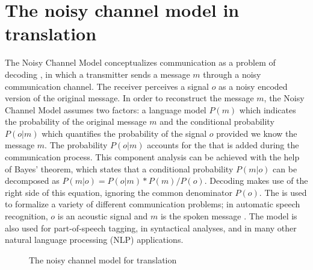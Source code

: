 \documentclass[output=paper]{LSP/langsci}
\begin{document}
\section{The noisy channel model in translation} 
\label{carl-schaeffer:sec:2}
The Noisy Channel Model conceptualizes communication as a problem of decoding \citep{Shannon1949}, in which a transmitter sends a message $m$ through a noisy communication channel. The receiver perceives a signal $o$ as a noisy encoded version of the original message. In order to reconstruct the message $m$, the Noisy Channel Model assumes two factors: a language model $P(m)$ which indicates the probability of the original message $m$ and the conditional probability $P(o|m)$ which quantifies the probability of the signal $o$ provided we know the message $m$. The probability $P(o|m)$ accounts for the  that is added during the communication process. This component analysis can be achieved with the help of Bayes' theorem, which states that a conditional probability $P(m|o)$ can be decomposed as $P(m|o) = P(o|m)*P(m)/P(o)$. Decoding makes use of the right side of this equation, ignoring the common denominator $P(o)$. The  is used to formalize a variety of different communication problems; in automatic speech recognition, $o$ is an acoustic signal and $m$ is the spoken message \citep{Mylonakis2007}. The model is also used for part-of-speech tagging, in syntactical analyses, and in many other natural language processing (NLP) applications. 

\begin{figure}
\begin{center}
\end{center}

\caption{The noisy channel model for translation}
\label{carl-schaeffer:fig:ncm}

\end{figure}
\end{document}
